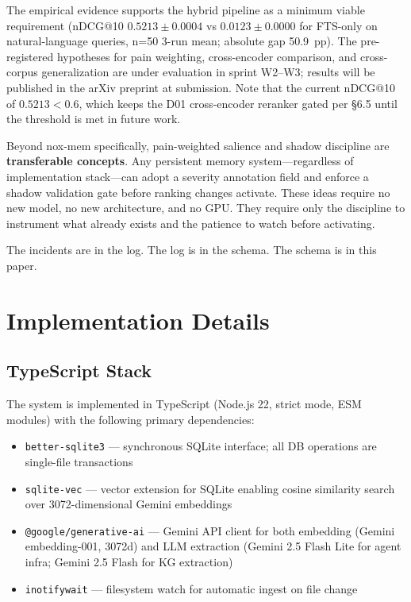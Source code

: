 \documentclass{article}
\begin{document}
The empirical evidence supports the hybrid pipeline as a minimum viable requirement
(nDCG@10 $0.5213 \pm 0.0004$ vs $0.0123 \pm 0.0000$ for FTS-only on natural-language
queries, n=50 3-run mean; absolute gap 50.9~pp). The pre-registered hypotheses for pain
weighting, cross-encoder comparison, and cross-corpus generalization are under evaluation
in sprint W2--W3; results will be published in the arXiv preprint at submission. Note that
the current nDCG@10 of $0.5213 < 0.6$, which keeps the D01 cross-encoder reranker gated
per \S6.5 until the threshold is met in future work.

Beyond nox-mem specifically, pain-weighted salience and shadow discipline are
\textbf{transferable concepts}. Any persistent memory system---regardless of implementation
stack---can adopt a severity annotation field and enforce a shadow validation gate before
ranking changes activate. These ideas require no new model, no new architecture, and no
GPU. They require only the discipline to instrument what already exists and the patience to
watch before activating.

The incidents are in the log. The log is in the schema. The schema is in this paper.




\appendix

\section{Implementation Details}

\subsection{TypeScript Stack}

The system is implemented in TypeScript (Node.js 22, strict mode, ESM modules) with the
following primary dependencies:

\begin{itemize}
  \item \texttt{better-sqlite3} --- synchronous SQLite interface; all DB operations are
    single-file transactions
  \item \texttt{sqlite-vec} --- vector extension for SQLite enabling cosine similarity
    search over 3072-dimensional Gemini embeddings
  \item \texttt{@google/generative-ai} --- Gemini API client for both embedding
    (Gemini embedding-001, 3072d) and LLM extraction (Gemini 2.5 Flash Lite for agent
    infra; Gemini 2.5 Flash for KG extraction)
  \item \texttt{inotifywait} --- filesystem watch for automatic ingest on file change
\end{itemize}
\end{document}
